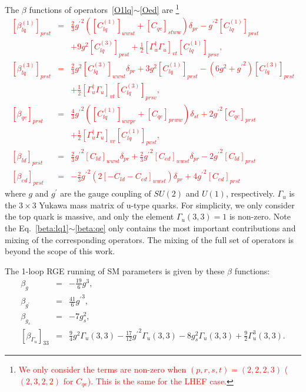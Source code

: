 \documentclass[a4paper,11pt]{article}
\begin{document}
The $\beta$ functions of operators~\ref{O1lq}$\sim$\ref{Oed} are
\footnote{\textcolor{red}{We only consider the terms are non-zero when $(p,r,s,t)=(2,2,2,3)$ ($(2,3,2,2)$ for $C_{qe}$). This is the same for the LHEF case.}}
\textcolor{red}{
\begin{eqnarray}
   \left[\beta^{(1)}_{lq}\right]_{prst} &=& \frac{2}{3}{g^\prime}^2\left([C^{(1)}_{lq}]_{wwst}+[C_{qe}]_{stww}\right)\delta_{pr}-{g^\prime}^2[C^{(1)}_{lq}]_{prst}  \nonumber \\
   &&+9g^2[C^{(3)}_{lq}]_{prst}+\frac{1}{2}[\Gamma_u^\dagger\Gamma_u]_{vt}[C^{(1)}_{lq}]_{prsv}, \label{beta:lq1}  \\
   \left[\beta^{(3)}_{lq}\right]_{prst} &=& \frac{2}{3}g^2[C^{(3)}_{lq}]_{wwst}\delta_{pr}+3g^2[C^{(1)}_{lq}]_{prst}-(6g^2+{g^\prime}^2)[C^{(3)}_{lq}]_{prst}  \nonumber \\ 
   && +\frac{1}{2}[\Gamma_u^\dagger\Gamma_u]_{vt}[C^{(3)}_{lq}]_{prsv}, \label{beta:lq3} \\
   \left[\beta_{qe}\right]_{prst} &=& \frac{4}{3}{g^{\prime}}^2\left([C^{(1)}_{lq}]_{wwpr}+[C_{qe}]_{prww}\right)\delta_{st}+2{g^{\prime}}^2[C_{qe}]_{prst} \nonumber  \\
   && +\frac{1}{2}[\Gamma_u^\dagger\Gamma_u]_{vr}[C^{(1)}_{lq}]_{pvst}, \label{beta:qe} \\
   \left[\beta_{ld}\right]_{prst}  &=& \frac{2}{3}{g^\prime}^2[C_{ld}]_{wwst}\delta_{pr}+\frac{2}{3}{g^\prime}^2[C_{ed}]_{wwst}\delta_{pr}-2{g^\prime}^2[C_{ld}]_{prst} \\
  \left[\beta_{ed}\right]_{prst} &=& -\frac{2}{3}{g^\prime}^2\left(2[-C_{ld}-C_{ed}]_{wwst}\right)\delta_{pr}+4{g^{\prime}}^2[C_{ed}]_{prst}
\end{eqnarray}
}
where $g$ and $g^\prime$ are the gauge coupling of $SU(2)$ and $U(1)$, respectively. 
$\Gamma_{u}$ is the $3\times 3$ Yukawa mass matrix of u-type quarks. 
For simplicity, we only consider the top quark is massive, 
and only the element $\Gamma_u(3,3)=1$ is non-zero.
Note the Eq.~\ref{beta:lq1}$\sim$\ref{beta:qe} only contains the most important contributions and mixing of the corresponding operators. 
The mixing of the full set of operators is beyond the scope of this work. 

The 1-loop RGE running of SM parameters is given by these $\beta$ functions:
\begin{eqnarray}
  \beta_{g} &=& -\frac{19}{6}g^3,  \\
  \beta_{g^\prime} &=& \frac{41}{6}{g^\prime}^3,  \\
  \beta_{g_s} &=& -7g^2_s, \\
  \left[\beta_{\Gamma_u}\right]_{33} &=& \frac{9}{4}g^2\Gamma_u(3,3)-\frac{17}{12} {g^\prime}^2\Gamma_u(3,3)-8g^2_s\Gamma_u(3,3)+\frac{9}{2}\Gamma^3_u(3,3).
\end{eqnarray}
\end{document}
